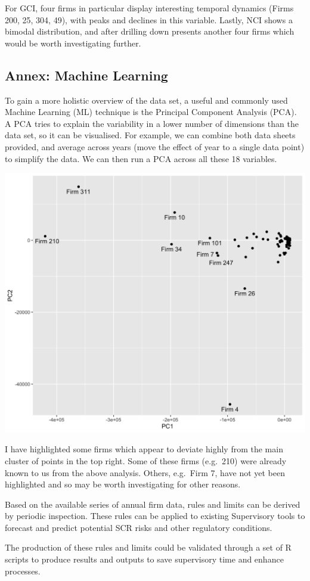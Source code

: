 \documentclass[
]{article}
\begin{document}
For GCI, four firms in particular display interesting temporal dynamics
(Firms 200, 25, 304, 49), with peaks and declines in this variable.
Lastly, NCI shows a bimodal distribution, and after drilling down
presents another four firms which would be worth investigating further.

\hypertarget{annex-machine-learning}{%
\subsection{Annex: Machine Learning}\label{annex-machine-learning}}

To gain a more holistic overview of the data set, a useful and commonly
used Machine Learning (ML) technique is the Principal Component Analysis
(PCA). A PCA tries to explain the variability in a lower number of
dimensions than the data set, so it can be visualised. For example, we
can combine both data sheets provided, and average across years (move
the effect of year to a single data point) to simplify the data. We can
then run a PCA across all these 18 variables.

\includegraphics[width=1\linewidth]{../figs/pca_plot}

I have highlighted some firms which appear to deviate highly from the
main cluster of points in the top right. Some of these firms (e.g.~210)
were already known to us from the above analysis. Others, e.g.~Firm 7,
have not yet been highlighted and so may be worth investigating for
other reasons.

Based on the available series of annual firm data, rules and limits can
be derived by periodic inspection. These rules can be applied to
existing Supervisory tools to forecast and predict potential SCR risks
and other regulatory conditions.

The production of these rules and limits could be validated through a
set of R scripts to produce results and outputs to save supervisory time
and enhance processes.
\end{document}

